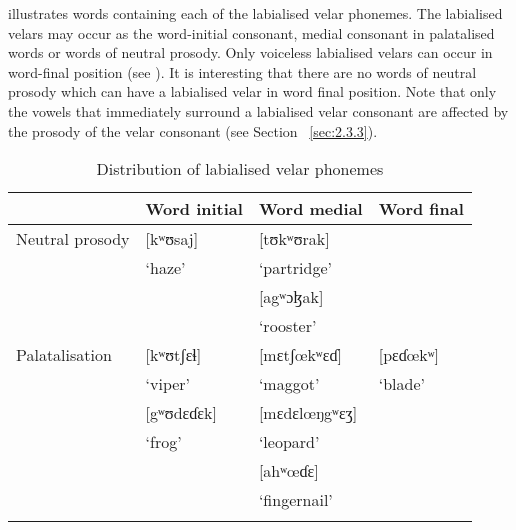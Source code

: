 \begin{table}
\caption{Minimal pairs for word-level labialised prosody vs. labialised consonant\label{tab:2.4}}
\end{table}

 illustrates words containing each of the labialised velar phonemes. The labialised velars may occur as the word-initial consonant, medial consonant in palatalised words or words of neutral prosody. Only voiceless labialised velars can occur in word-final position (see ). It is interesting that there are no words of neutral prosody which can have a labialised velar in word final position. Note that only the vowels that immediately surround a labialised velar consonant are affected by the prosody of the velar consonant (see Section~ \ref{sec:2.3.3}).

\begin{table}
\begin{tabular}{llll} 
\lsptoprule
& {Word initial} & {Word medial} & {Word final}\\
\midrule
{Neutral prosody} & [kʷʊsaj]      & [tʊkʷʊrak]     \\
& ‘haze’ & ‘partridge’ &\\
& & [agʷɔɮak]       & \\
& & ‘rooster’ &\\
{Palatalisation} & [kʷʊtʃɛɬ]      & [mɛtʃœkʷɛɗ]   & [pɛɗœkʷ]       \\
& ‘viper’ & ‘maggot’ & ‘blade’\\
& [gʷʊdɛɗɛk]  & {}[mɛdɛlœŋgʷɛʒ]  & \\
& ‘frog’ & ‘leopard’ & \\
& & [ahʷœɗɛ]       & \\
& & ‘fingernail’ & \\
\lspbottomrule
\end{tabular}
\caption{Distribution of labialised velar phonemes\label{tab:2.5}}
\end{table}

